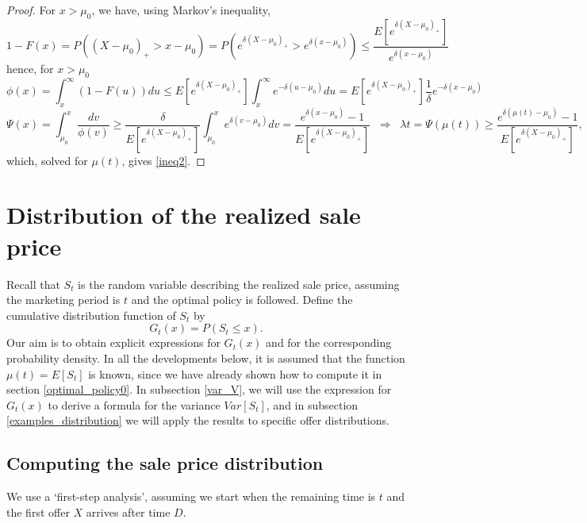 \documentclass{article}
\numberwithin{equation}{section}
\begin{document}
\begin{proof}
	For $x>\mu_0$, we have, using Markov's inequality,
	$$1-F(x)=P((X-\mu_0)_+>x-\mu_0)=P(e^{\delta (X-\mu_0)_+}>e^{\delta (x-\mu_0)})\leq \frac{E[e^{\delta (X-\mu_0)_+}]}{e^{\delta (x-\mu_0)}}$$
	hence, for $x>\mu_0$
	$$\phi(x)=\int_x^\infty (1-F(u))du\leq E[e^{\delta (X-\mu_0)_+}]\int_{x}^\infty e^{-\delta (u-\mu_0)}du= E[e^{\delta (X-\mu_0)_+}]\frac{1}{\delta}e^{-\delta (x-\mu_0)}$$
	$$\Psi(x)=\int_{\mu_0}^{x}\frac{dv}{\phi(v)}\geq \frac{\delta}{E[e^{\delta (X-\mu_0)_+}]}\int_{\mu_0}^x e^{\delta (v-\mu_0)} dv= \frac{e^{\delta (x-\mu_0)}-1}{E[e^{\delta (X-\mu_0)_+}]}\;\;\Rightarrow\;\; \lambda t=\Psi(\mu(t))\geq \frac{e^{\delta (\mu(t)-\mu_0)}-1}{E[e^{\delta (X-\mu_0)_+}]},$$
	which, solved for $\mu(t)$, gives \eqref{ineq2}.
\end{proof}


\section{Distribution of the realized sale price}
\label{price_distribution}

Recall that $S_t$ is the random variable 
describing the realized sale price, assuming the marketing period is $t$ and the
optimal policy is followed. 
Define the cumulative distribution function of $S_t$ by
$$G_t(x)=P(S_t\leq x).$$
Our aim is to obtain explicit expressions for $G_t(x)$ and for the corresponding probability density. In all the developments below, it is assumed that the
function $\mu(t)=E[S_t]$ is known, since we have already shown how to compute it in section \ref{optimal_policy0}. In subsection \ref{var_V}, we will use the expression for $G_t(x)$ to derive a formula for the variance $Var[S_t]$, and in subsection \ref{examples_distribution}
we will apply the results to specific offer distributions.


\subsection{Computing the sale price distribution}

We use a `first-step analysis', assuming we start when the remaining time is $t$ and the first offer $X$ arrives 
after time $D$. 
\end{document}
